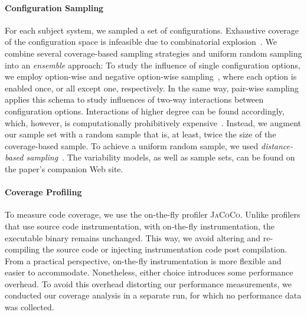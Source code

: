 \paragraph*{Configuration Sampling}\label{sec:sampling}
For each subject system, we sampled a set of configurations. Exhaustive coverage of the configuration space is infeasible due to combinatorial explosion~\cite{henardCombining2015}. We combine several coverage-based sampling strategies and uniform random sampling into an \emph{ensemble} approach: To study the influence of single configuration options, we employ option-wise and negative option-wise sampling~\cite{siegmundPerformanceinfluenceModelsHighly2015}, where each option is enabled once, or all except one, respectively. In the same way, pair-wise sampling applies this schema to study influences of two-way interactions between configuration options. Interactions of higher degree can be found accordingly, which, however, is computationally prohibitively expensive~\cite{henardCombining2015}. Instead, we augment our sample set with a random sample that is, at least, twice the size of the coverage-based sample. To achieve a uniform random sample, we used \emph{distance-based sampling}~\cite{kaltenecker_distance-based_2019}. The variability models, as well as sample sets, can be found on the paper's companion Web site.
	
\paragraph*{Coverage Profiling}\label{sec:profiling}
To measure code coverage, we use the on-the-fly profiler \textsc{JaCoCo}. Unlike profilers that use source code instrumentation, with on-the-fly instrumentation, the executable binary remains unchanged. This way, we avoid altering and re-compiling the source code or injecting instrumentation code post compilation. From a practical perspective, on-the-fly instrumentation is more flexible and easier to accommodate. Nonetheless, either choice introduces some performance overhead. To avoid this overhead distorting our performance measurements, we conducted our coverage analysis in a separate run, for which no performance data was collected. 	
	
